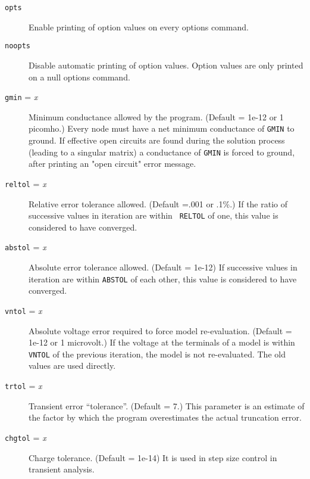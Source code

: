 \begin{description}
\item[{\tt opts}] Enable printing of option values on every options
command.

\item[{\tt noopts}] Disable automatic printing of option values.
Option values are only printed on a null options command.

\item[{\tt gmin} = {\it x}] Minimum conductance allowed by the program.
(Default = 1e-12 or 1 picomho.)  Every node must have a net
minimum conductance of {\tt GMIN} to ground.  If effective open
circuits are found during the solution process (leading to a
singular matrix) a conductance of {\tt GMIN} is forced to
ground, after printing an "open circuit" error message.

\item[{\tt reltol} = {\it x}] Relative error tolerance allowed.
(Default =.001 or .1\%.)
If the ratio of successive values in iteration are within {\tt
RELTOL} of one, this value is considered to have converged.

\item[{\tt abstol} = {\it x}] Absolute error tolerance
allowed.  (Default = 1e-12)
If successive values in iteration are within {\tt ABSTOL} of
each other, this value is considered to have converged.

\item[{\tt vntol} = {\it x}] Absolute voltage error required to
force model re-evaluation.  (Default = 1e-12 or 1 microvolt.)
If the voltage at the terminals of a model is within {\tt
VNTOL} of the previous iteration, the model is not
re-evaluated.  The old values are used directly.

\item[{\tt trtol} = {\it x}] Transient error ``tolerance''.
(Default = 7.)  This parameter is an estimate of the factor by
which the program overestimates the actual truncation error.

\item[{\tt chgtol} = {\it x}] Charge tolerance.  (Default =
1e-14) It is used in step size control in transient analysis.


\end{description}
